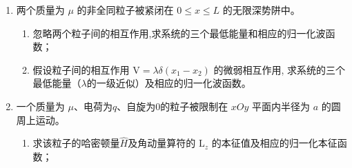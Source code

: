 \begin{enumerate}
{}

	
\item 
两个质量为 $\mu$ 的非全同粒子被紧闭在 $0 \leq x \leq L$ 的无限深势阱中。
\begin{enumerate}
	\item
忽略两个粒子间的相互作用,求系统的三个最低能量和相应的归一化波函数；
\item 	
假设粒子间的相互作用 $\mathrm{V}=\lambda \delta\left(x_{1}-x_{2}\right)$ 的微弱相互作用, 求系统的三个最低能量（$ \lambda $的一级近似）及相应的归一化波函数。
\end{enumerate}


\newpage
\item 
一个质量为 $\mu$、电荷为$ q $、自旋为$ 0 $的粒子被限制在 $xOy$ 平面内半径为 $a$ 的圆周上运动。
\begin{enumerate}
	\item
	求该粒子的哈密顿量$ \hat{H} $及角动量算符的 $\mathrm{L}_{z}$ 的本征值及相应的归一化本征函数；


\end{enumerate}
\end{enumerate}
